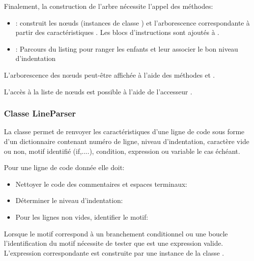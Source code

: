 Finalement, la construction de l'arbre  nécessite l'appel des méthodes:
\begin{itemize}
	\item {}: construit les n\oe uds (instances de classe ) et l'arborescence correspondante à partir des caractéristiques . Les blocs d'instructions sont ajoutés à .
	
	\item {}: Parcours du listing  pour ranger les enfants et leur associer le bon niveau d'indentation
\end{itemize} 


L'arborescence des n\oe uds  peut-être affichée à l'aide des méthodes  et .

L'accès à la liste de n\oe uds  est possible à l'aide de l'accesseur .

\subsubsection{Classe LineParser}

La classe  permet de renvoyer les caractéristiques d'une ligne de code sous forme d'un dictionnaire contenant numéro de ligne, niveau d'indentation, caractère vide ou non, motif identifié (if,....), condition, expression ou variable le cas échéant.

Pour une ligne de code donnée elle doit:
\begin{itemize}
	\item Nettoyer le code des commentaires et espaces terminaux: 
	\item Déterminer le niveau d'indentation: 
	\item Pour les lignes non vides, identifier le motif: 
\end{itemize}

Lorsque le motif correspond à un branchement conditionnel  ou une boucle  l'identification du motif  nécessite de tester que  est une expression valide. L'expression correspondante est construite par une instance de la classe .



